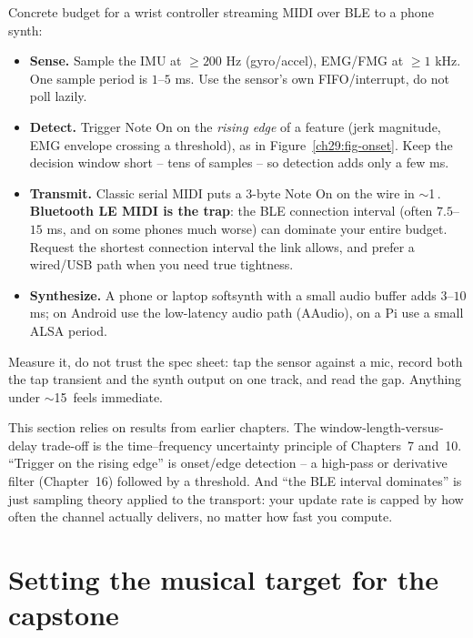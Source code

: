 \begin{buildbox}
Concrete budget for a wrist controller streaming MIDI over BLE to a phone synth:
\begin{itemize}
  \item \textbf{Sense.} Sample the IMU at $\ge 200$ Hz (gyro/accel), EMG/FMG at $\ge 1$ kHz. One
    sample period is $1$--$5$ ms. Use the sensor's own FIFO/interrupt, do not poll lazily.
  \item \textbf{Detect.} Trigger Note On on the \emph{rising edge} of a feature (jerk magnitude, EMG
    envelope crossing a threshold), as in Figure~\ref{ch29:fig-onset}. Keep the decision window
    short -- tens of samples -- so detection adds only a few ms.
  \item \textbf{Transmit.} Classic serial MIDI puts a $3$-byte Note On on the wire in $\sim$1\,.
    \textbf{Bluetooth LE MIDI is the trap}: the BLE connection interval (often $7.5$--$15$ ms, and on
    some phones much worse) can dominate your entire budget. Request the shortest connection interval
    the link allows, and prefer a wired/USB path when you need true tightness.
  \item \textbf{Synthesize.} A phone or laptop softsynth with a small audio buffer adds $3$--$10$ ms;
    on Android use the low-latency audio path (AAudio), on a Pi use a small ALSA period.
\end{itemize}
Measure it, do not trust the spec sheet: tap the sensor against a mic, record both the tap transient
and the synth output on one track, and read the gap. Anything under $\sim$15\, feels immediate.
\end{buildbox}

\begin{connectionbox}
This section relies on results from earlier chapters. The window-length-versus-delay
trade-off is the time--frequency uncertainty principle of Chapters~7 and~10. ``Trigger on the rising
edge'' is onset/edge detection -- a high-pass or derivative filter (Chapter~16) followed by a
threshold. And ``the BLE interval dominates'' is just sampling theory applied to the transport: your
update rate is capped by how often the channel actually delivers, no matter how fast you compute.
\end{connectionbox}

\section{Setting the musical target for the capstone}
\label{ch29:target}

